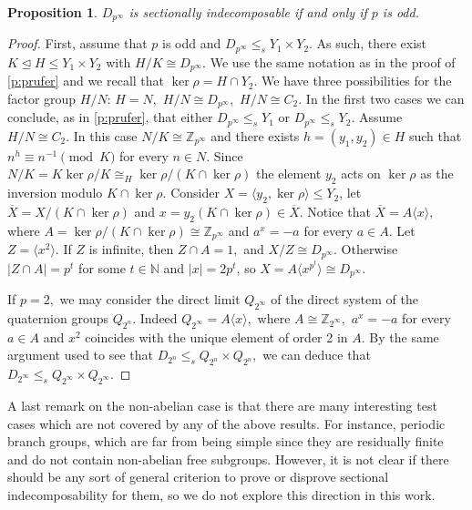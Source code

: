 \documentclass[a4paper,10pt]{amsart}
\theoremstyle{plain}
\newtheorem{proposition}[thm]{Proposition}
\theoremstyle{definition}
\begin{document}
\begin{proposition}
    $D_{p^\infty}$ is sectionally indecomposable if and only if $p$ is odd.
\end{proposition}
\begin{proof}
First, assume that $p$ is odd and $D_{p^\infty}\leq_s Y_1\times Y_2$. As such, there exist $K\unlhd H\leq Y_1\times Y_2$ with $H/K\cong D_{p^\infty}$. We use the same notation as in the proof of \cref{p:prufer} and we recall that $\ker \rho = H \cap Y_2$. We have three possibilities for the factor group $H/N$: $H=N,$ $H/N \cong D_{p^\infty},$ $H/N \cong C_2.$ In the first two cases we can conclude, as in \cref{p:prufer}, that either $D_{p^\infty}\leq_s Y_1$ or  $D_{p^\infty}\leq_s Y_2.$ Assume $H/N\cong C_2.$
In this case $N/K \cong \mathbb Z_{p^\infty}$ and
there exists $h=(y_1,y_2)\in H$ such that $n^h\equiv n^{-1}\pmod K$ for every $n\in N.$ Since $N/K = K\ker\rho/K\cong_H \ker\rho/(K\cap \ker\rho)$ the element $y_2$ acts on $\ker \rho$ as the inversion modulo $K\cap \ker \rho.$ Consider $X=\langle y_2,\ker\rho\rangle\leq Y_2$, let $\overline X=X/(K\cap \ker \rho)$ 
and $x=y_2(K\cap \ker \rho)\in \overline X.$ Notice that $\overline X=A\langle x\rangle,$ where $A=\ker\rho/(K\cap \ker \rho) \cong \mathbb Z_{p^\infty}$
and $a^x=-a$ for every $a\in A.$ Let $Z=\langle x^2\rangle.$ If $Z$ is infinite, then $Z \cap A=1,$
and $X/Z\cong D_{p^\infty}.$ Otherwise $|Z\cap A|=p^t$ for some $t\in \mathbb N$ and $|x|=2p^t$, so $X=A\langle x^{p^t}\rangle\cong D_{p^\infty}.$

If $p=2,$ we may consider the direct limit $Q_{2^\infty}$ of the direct system of the quaternion groups $Q_{2^n}$. Indeed $Q_{2^\infty}=A\langle x\rangle,$ where $A\cong \mathbb Z_{2^\infty},$
$a^x=-a$ for every $a\in A$ and $x^2$ coincides with the unique element of order 2 in $A.$ By the same argument used to see that $D_{2^n}\leq_s Q_{2^n}\times Q_{2^n},$  we can deduce that $D_{2^\infty}\leq_s Q_{2^\infty}\times Q_{2^\infty}.$
\end{proof}

A last remark on the non-abelian case is that there are many interesting test cases which are not covered by any of the above results. For instance, periodic branch groups, which are far from being simple since they are residually finite and do not contain non-abelian free subgroups. However, it is not clear if there should be any sort of general criterion to prove or disprove sectional indecomposability for them, so we do not explore this direction in this work.
\end{document}
